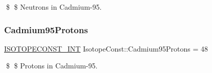 \$ \$ Neutrons in Cadmium-\/95. \mbox{\label{group___isotope_const-_cadmium-_cd95_ga6ec4ba617025919f14e51996853e02db}} 
\subsubsection{\texorpdfstring{Cadmium95\+Protons}{Cadmium95Protons}}
{\footnotesize\ttfamily \mbox{\hyperlink{group___isotope_const-_macros_ga5f18360b3e99483a35c32d789e62621c}{I\+S\+O\+T\+O\+P\+E\+C\+O\+N\+S\+T\+\_\+\+I\+NT}} Isotope\+Const\+::\+Cadmium95\+Protons = 48}

\$ \$ Protons in Cadmium-\/95. 